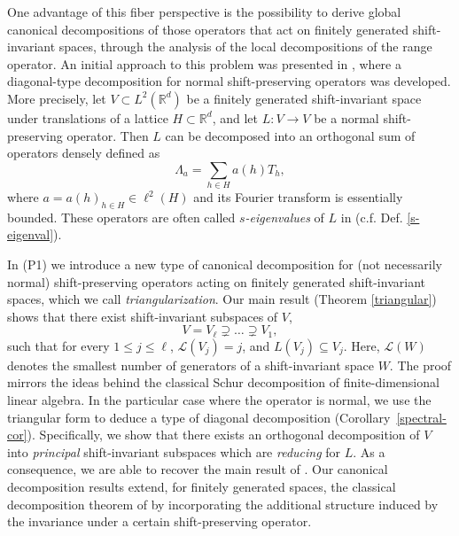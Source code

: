 \documentclass[a4paper,11pt]{amsart}
\theoremstyle{definition}
\theoremstyle{definition}
\def\La{\Lambda}
\def\R{\mathbb{R}}
\def\ele{\mathcal{L}}
\begin{document}
	One advantage of this fiber perspective is the possibility to derive global canonical decompositions of those operators that act on finitely generated shift-invariant spaces, through the analysis of the local decompositions of the range operator. An initial approach to this problem was presented in \cite{ACCP}, where a diagonal-type decomposition for normal shift-preserving operators was developed. More precisely, let $V\subset L^2(\R^d)$ be a finitely generated shift-invariant space under translations of a lattice $H\subset \R^d$, and let $L:V\to V$ be a normal shift-preserving operator. Then $L$ can be decomposed into an orthogonal sum of operators densely defined as
	$$\La_a = \sum_{h\in H} a(h) T_h,$$
	where $a={a(h)}_{h\in H}\in \ell^2(H)$ and its Fourier transform is essentially bounded. These operators are often called \textit{$s$-eigenvalues} of $L$ in \cite{ACCP} (c.f. Def. \ref{s-eigenval}). 
	
	In (P1) we introduce a new type of canonical decomposition for (not necessarily normal) shift-preserving operators acting on finitely generated shift-invariant spaces, which we call \textit{triangularization}. Our main result (Theorem \ref{triangular}) shows that there exist shift-invariant subspaces of $V$, 
	$$
	V=V_\ell\supsetneq \dots\supsetneq V_{1},
	$$ 
	such that for every $1\leq j\leq\ell$,  $\ele(V_j)=j$, and $ L(V_j)\subseteq V_j$. Here, $\ele(W)$ denotes the smallest number of generators of a shift-invariant space $W$. The proof mirrors the ideas behind the classical Schur decomposition of finite-dimensional linear algebra. In the particular case where the operator is normal, we use the triangular form to deduce a type of diagonal decomposition (Corollary~\ref{spectral-cor}). Specifically, we show that there exists an orthogonal decomposition of $V$ into \textit{principal} shift-invariant subspaces which are \textit{reducing} for $L$. As a consequence, we are able to recover the main result of \cite{ACCP}. Our canonical decomposition results extend, for finitely generated spaces, the classical decomposition theorem of \cite{B} by incorporating the additional structure induced by the invariance under a certain shift-preserving operator.
	
	\medskip
	
\end{document}
